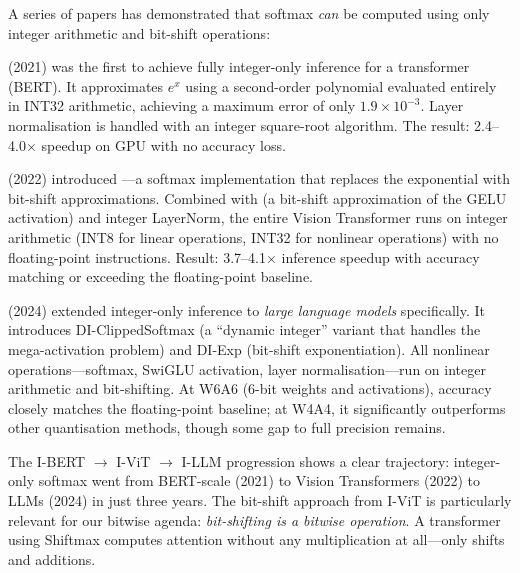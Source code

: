 A series of papers has demonstrated that softmax \emph{can} be
computed using only integer arithmetic and bit-shift operations:

\begin{description}[leftmargin=1em]
  \item[I-BERT~\cite{kim2021ibert}] (2021) was the first to achieve
    fully integer-only inference for a transformer (BERT). It
    approximates $e^x$ using a second-order polynomial evaluated
    entirely in INT32 arithmetic, achieving a maximum error of only
    $1.9 \times 10^{-3}$. Layer normalisation is handled with an
    integer square-root algorithm. The result: 2.4--4.0$\times$
    speedup on GPU with no accuracy loss.

  \item[I-ViT~\cite{li2022ivit}] (2022) introduced
    ---a softmax implementation that replaces
    the exponential with bit-shift approximations. Combined with
     (a bit-shift approximation of the GELU
    activation) and integer LayerNorm, the entire Vision Transformer
    runs on integer arithmetic (INT8 for linear operations, INT32
    for nonlinear operations) with no floating-point instructions.
    Result: 3.7--4.1$\times$ inference speedup with accuracy
    matching or exceeding the floating-point baseline.

  \item[I-LLM~\cite{hu2024illm}] (2024) extended integer-only
    inference to \emph{large language models} specifically. It
    introduces DI-ClippedSoftmax (a ``dynamic integer'' variant
    that handles the mega-activation problem) and DI-Exp (bit-shift
    exponentiation). All nonlinear operations---softmax, SwiGLU
    activation, layer normalisation---run on integer arithmetic and
    bit-shifting. At W6A6 (6-bit weights and activations), accuracy
    closely matches the floating-point baseline; at W4A4, it
    significantly outperforms other quantisation methods, though
    some gap to full precision remains.
\end{description}

\begin{engineernote}
The I-BERT $\to$ I-ViT $\to$ I-LLM progression shows a clear
trajectory: integer-only softmax went from BERT-scale (2021) to
Vision Transformers (2022) to LLMs (2024) in just three years.
The bit-shift approach from I-ViT is particularly relevant for
our bitwise agenda: \emph{bit-shifting is a bitwise operation}.
A transformer using Shiftmax computes attention without any
multiplication at all---only shifts and additions.
\end{engineernote}

